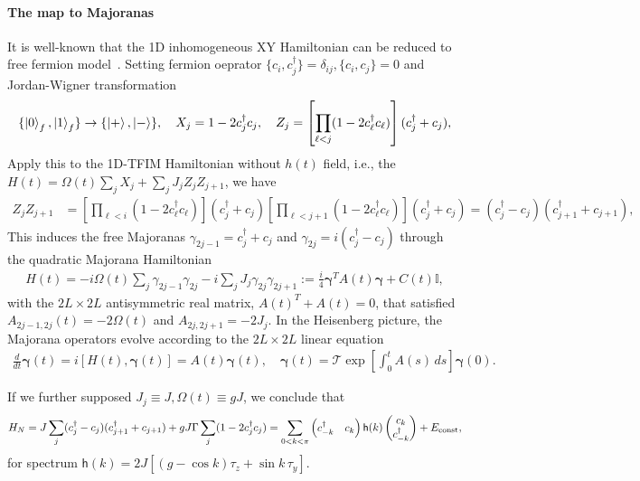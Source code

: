 \paragraph{The map to Majoranas}
It is well-known that the 1D inhomogeneous XY Hamiltonian
can be reduced to free fermion model~\cite{takahashi1999thermodynamics}.
Setting fermion oeprator $\{c_i,c^\dagger_j\} = \delta_{ij}, \{c_i,c_j\} = 0$ and Jordan-Wigner transformation 
    \begin{align}
        \{\ket{0}_f,\ket{1}_f\} \to \{\ket{+},\ket{-}\},\quad 
        X_j=1-2c^\dagger_j c_j, 
        \quad Z_j =\left[\prod_{\ell<j}(1-2c^\dagger_\ell c_\ell)\right](c_j^\dagger+c_j),
    \end{align}
Apply this to the 1D-TFIM Hamiltonian without $h(t)$ field, i.e., the $H(t) = \Omega(t)\sum_jX_j + \sum_jJ_{j} Z_jZ_{j+1}$, we have
\begin{align}
    Z_j Z_{j+1}  &=\left[\prod_{\ell<i}(1-2c^\dagger_\ell c_\ell)\right](c_j^\dagger+c_j)\left[\prod_{\ell<j+1}(1-2c^\dagger_\ell c_\ell)\right](c_j^\dagger+c_j) =(c_j^\dagger-c_j)(c_{j+1}^\dagger+c_{j+1}),
\end{align}
 This induces the free Majoranas $\gamma_{2j-1}=c_j^\dagger+c_j$ and $\gamma_{2j}=i(c_j^\dagger-c_j)$ through the quadratic Majorana Hamiltonian
 \begin{align}
    H(t)=-i\Omega(t)\sum_j\gamma_{2j-1}\gamma_{2j}-i\sum_jJ_j\gamma_{2j}\gamma_{2j+1} := \frac{i}{4}\boldsymbol{\gamma}^{T}A(t)\boldsymbol{\gamma}+C(t)\mathbb I,
 \end{align}
with the $2L \times 2L$ antisymmetric real matrix, $A(t)^T + A(t) = 0$, that satisfied $A_{2j-1,2j}(t)=-2\Omega(t)$ and $A_{2j,2j+1}=-2J_j$. In the Heisenberg picture, the Majorana operators evolve according to the $2L \times 2L$ linear equation
\begin{align}
\frac{d}{dt}\boldsymbol{\gamma}(t)=i[H(t),\boldsymbol{\gamma}(t)]=A(t)\boldsymbol{\gamma}(t), \quad \boldsymbol{\gamma}(t) =\mathcal T\exp\!\left[\int_0^tA(s)\,ds\right]\boldsymbol{\gamma}(0).
\end{align}

If we further supposed $J_{j}\equiv J,\Omega(t) \equiv gJ$, we conclude that
\begin{align}
    H_N
    =J\sum_j(c_j^\dagger-c_j)(c_{j+1}^\dagger+c_{j+1})+gJ\Gamma\sum_j(1-2c_j^\dagger c_j)
    =\sum_{0<k<\pi}    
    \begin{pmatrix}c^\dagger_{-k}&c_{k}\end{pmatrix}\mathsf h(k)\begin{pmatrix}
    c_k\\
    c^\dagger_{-k}
    \end{pmatrix}+E_{\rm const},
\end{align}
for spectrum $\mathsf h(k)=2J\left[(g-\cos k)\tau_z+\sin k\,\tau_y\right]$.

